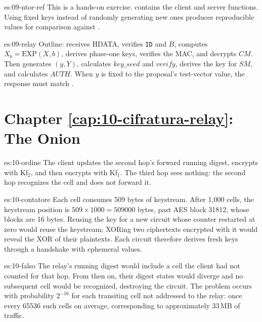 \begin{soluzione}{es:09-ntor-ref}
This is a hands-on exercise.  contains the client and server functions. Using fixed keys instead of randomly generating new ones produces reproducible values for comparison against .
\end{soluzione}

\begin{soluzione}{es:09-relay}
Outline:  receives HDATA, verifies \texttt{ID} and $B$, computes $X_b = \mathrm{EXP}(X, b)$, derives phase-one keys, verifies the MAC, and decrypts $CM$. Then  generates $(y, Y)$, calculates $\mathit{key\_seed}$ and $\mathit{verify}$, derives the key for $SM$, and calculates $\mathit{AUTH}$. When $y$ is fixed to the proposal's test-vector value, the response must match .
\end{soluzione}

\section*{Chapter \ref{cap:10-cifratura-relay}: The Onion}

\begin{soluzione}{es:10-ordine}
The client updates the second hop's forward running digest, encrypts with Kf$_2$, and then encrypts with Kf$_1$. The third hop sees nothing: the second hop recognizes the cell and does not forward it.
\end{soluzione}

\begin{soluzione}{es:10-contatore}
Each cell consumes 509 bytes of keystream. After 1,000 cells, the keystream position is $509 \times 1000 = \num{509000}$ bytes, past AES block \num{31812}, whose blocks are 16 bytes. Reusing the key for a new circuit whose counter restarted at zero would reuse the keystream; XORing two ciphertexts encrypted with it would reveal the XOR of their plaintexts. Each circuit therefore derives fresh keys through a handshake with ephemeral values.
\end{soluzione}

\begin{soluzione}{es:10-falso}
The relay's running digest would include a cell the client had not counted for that hop. From then on, their digest states would diverge and no subsequent cell would be recognized, destroying the circuit. The problem occurs with probability $2^{-16}$ for each transiting cell not addressed to the relay: once every \num{65536} such cells on average, corresponding to approximately 33\,MB of traffic.
\end{soluzione}


